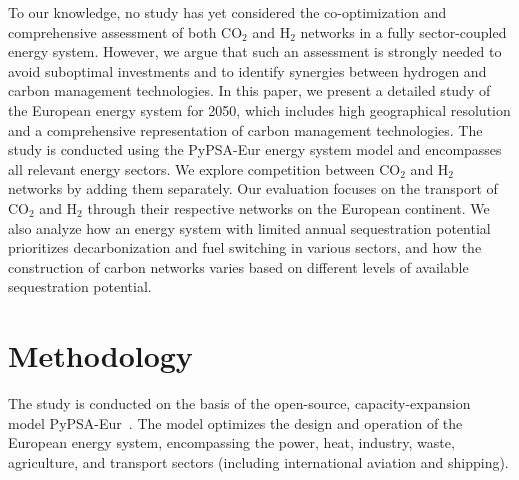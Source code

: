 \documentclass[twocolumn]{article}
\newcommand{\carbon}{CO$_2$}
\newcommand{\hydrogen}{H$_2$}
\begin{document}
To our knowledge, no study has yet considered the co-optimization and comprehensive assessment of both \carbon{} and \hydrogen{} networks in a fully sector-coupled energy system. However, we argue that such an assessment is strongly needed to avoid suboptimal investments and to identify synergies between hydrogen and carbon management technologies. In this paper, we present a detailed study of the European energy system for 2050, which includes high geographical resolution and a comprehensive representation of carbon management technologies. The study is conducted using the PyPSA-Eur energy system model and encompasses all relevant energy sectors. We explore competition between \carbon{} and \hydrogen{} networks by adding them separately. Our evaluation focuses on the transport of \carbon{} and \hydrogen{} through their respective networks on the European continent. We also analyze how an energy system with limited annual sequestration potential prioritizes decarbonization and fuel switching in various sectors, and how the construction of carbon networks varies based on different levels of available sequestration potential.


\section{Methodology}
\label{sec:methodology}

The study is conducted on the basis of the open-source, capacity-expansion model PyPSA-Eur~\cite{horschPyPSAEurOpenOptimisation2018,brownSynergiesSectorCoupling2018,PyPSAEurSecSectorCoupledOpen2023}.
The model optimizes the design and operation of the European energy system, encompassing the power, heat, industry, waste, agriculture, and transport sectors (including international aviation and shipping).
\end{document}
